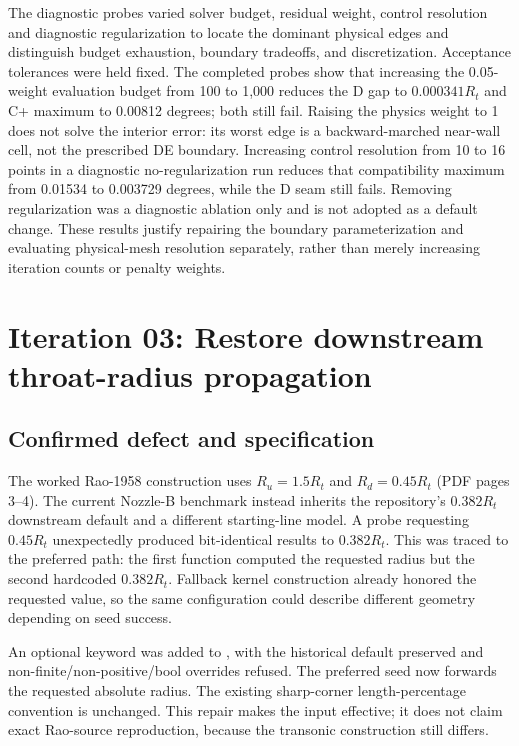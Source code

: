 The diagnostic probes varied solver budget, residual weight, control resolution and
diagnostic regularization to locate the dominant physical edges and distinguish
budget exhaustion, boundary tradeoffs, and discretization. Acceptance tolerances
were held fixed. The completed probes show that increasing the 0.05-weight
evaluation budget from 100 to 1,000 reduces the D gap to $0.000341R_t$ and
C+ maximum to 0.00812 degrees; both still fail. Raising the physics weight to
1 does not solve the interior error: its worst edge is a backward-marched
near-wall cell, not the prescribed DE boundary. Increasing control resolution
from 10 to 16 points in a diagnostic no-regularization run reduces that
compatibility maximum from 0.01534 to 0.003729 degrees, while the D seam
still fails. Removing regularization was a diagnostic ablation only and is
not adopted as a default change. These results justify repairing the boundary
parameterization and evaluating physical-mesh resolution separately, rather
than merely increasing iteration counts or penalty weights.

\section{Iteration 03: Restore downstream throat-radius propagation}
\subsection{Confirmed defect and specification}
The worked Rao-1958 construction uses $R_u=1.5R_t$ and
$R_d=0.45R_t$ (PDF pages 3--4). The current Nozzle-B benchmark instead
inherits the repository's $0.382R_t$ downstream default and a different
starting-line model. A probe requesting $0.45R_t$ unexpectedly produced
bit-identical results to $0.382R_t$. This was traced to the preferred
 path: the first function
computed the requested radius but the second hardcoded $0.382R_t$.
Fallback kernel construction already honored the requested value, so the
same configuration could describe different geometry depending on seed success.

An optional keyword  was added to , with
the historical default preserved and non-finite/non-positive/bool overrides
refused. The preferred seed now forwards the requested absolute radius.
The existing sharp-corner length-percentage convention is unchanged. This
repair makes the input effective; it does not claim exact Rao-source
reproduction, because the transonic construction still differs.

